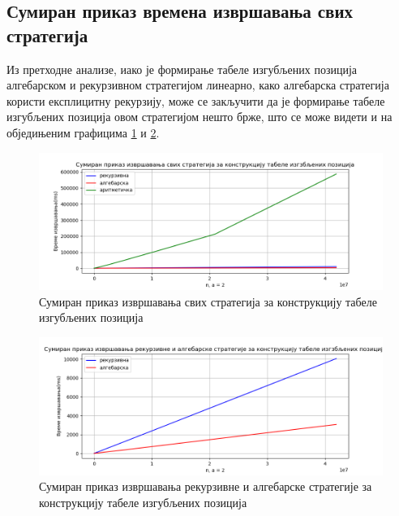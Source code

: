 \documentclass[a4paper]{article}
\begin{document}
\subsection{Сумиран приказ времена извршавања свих стратегија}

Из претходне анализе, иако је формирање табеле изгубљених позиција алгебарском и рекурзивном стратегијом линеарно, како алгебарска стратегија користи експлицитну рекурзију, може се закључити да је формирање табеле изгубљених позиција овом стратегијом нешто брже, што се може видети и на обједињеним графицима \ref{fig:all} и \ref{fig:algebraicVrecursive}.

\begin{figure}[H]
	\begin{center}
		\includegraphics[width=\textwidth]{all.png}
	\end{center}
	\caption{Сумиран приказ извршавања свих стратегија за конструкцију табеле изгубљених позиција}
	\label{fig:all}
\end{figure}

\begin{figure}[H]
	\begin{center}
		\includegraphics[width=\textwidth]{algebraicVSrecursive.png}
	\end{center}
	\caption{Сумиран приказ извршавања рекурзивне и алгебарске стратегије за конструкцију табеле изгубљених позиција}
	\label{fig:algebraicVrecursive}
\end{figure}
\end{document}
